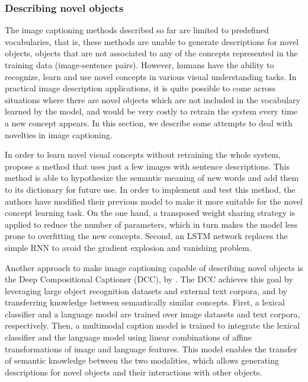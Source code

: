 \subsubsection{Describing novel objects}\label{sec:novel_objects}

The image captioning methods described so far are limited to predefined vocabularies, that is, these methods are unable to generate descriptions for novel objects, objects that are not associated to any of the concepts represented in the training data (image-sentence pairs). However, humans have the ability to recognize, learn and use novel concepts in various visual understanding tasks. In practical image description applications, it is quite possible to come across situations where there are novel objects which are not included in the vocabulary learned by the model, and would be very costly to retrain the system every time a new concept appears. In this section, we describe some attempts to deal with novelties in image captioning.

In order to learn novel visual concepts without retraining the whole system, \citet{Mao2015_Child} propose a method that uses just a few images with sentence descriptions. This method is able to hypothesize the semantic meaning of new words and add them to its dictionary for future use. In order to implement and test this method, the authors have modified their previous model \citep{Mao2015_mRNN} to make it more suitable for the novel concept learning task. On the one hand, a transposed weight sharing strategy is applied to reduce the number of parameters, which in turn makes the model less prone to overfitting the new concepts. Second, an LSTM network replaces the simple RNN to avoid the gradient explosion and vanishing problem. 

Another approach to make image captioning capable of describing novel objects is the Deep Compositional Captioner (DCC), by \citet{Hendricks2016}. The DCC achieves this goal by leveraging large object recognition datasets and external text corpora, and by transferring knowledge between semantically similar concepts. First, a lexical classifier and a language model are trained over image datasets and text corpora, respectively. Then, a multimodal caption model is trained to integrate the lexical classifier and the language model using linear combinations of affine transformations of image and language features. This model enables the transfer of semantic knowledge between the two modalities, which allows generating descriptions for novel objects and their interactions with other objects. 

